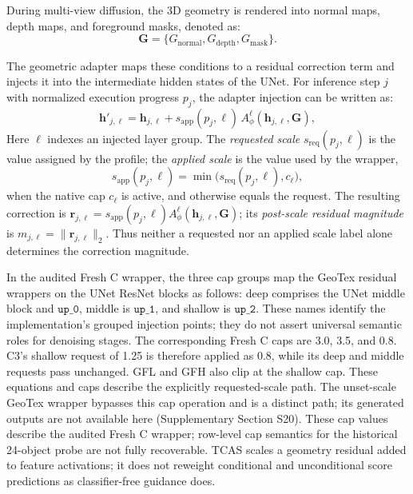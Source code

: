 \documentclass[times,twocolumn,final]{elsarticle}
\providecommand{\DIFadd}[1]{{\protect\color{blue} \sf #1}} %
\providecommand{\DIFaddbegin}{} %
\providecommand{\DIFaddend}{} %
\begin{document}
During multi-view diffusion, the 3D geometry is rendered into normal maps, depth maps, and foreground masks, denoted as:
\begin{equation}
\mathbf{G} = \{G_\text{normal}, G_\text{depth}, G_\text{mask}\}.
\end{equation}

The geometric adapter maps these conditions to a residual correction term and injects it into the intermediate hidden states of the UNet. For   \DIFaddbegin \DIFadd{inference step $j$ with normalized execution progress $p_j$}\DIFaddend , the adapter injection can be written as:
  \DIFaddbegin \begin{equation}
\mathbf{h}'_{j,\ell} = \mathbf{h}_{j,\ell} + s_{\mathrm{app}}(p_j,\ell)\, A^\ell_\phi(\mathbf{h}_{j,\ell}, \mathbf{G}),
\label{eq:injection}
\end{equation}\DIFaddend 
  \DIFaddbegin \DIFadd{Here $\ell$ indexes an injected layer group. The \emph{requested scale} $s_{\mathrm{req}}(p_j,\ell)$ is the value assigned by the profile; the \emph{applied scale} is the value used by the wrapper,
}\begin{equation}
s_{\mathrm{app}}(p_j,\ell)=\min\!\bigl(s_{\mathrm{req}}(p_j,\ell),c_\ell\bigr),
\end{equation}
\DIFadd{when the native cap $c_\ell$ is active, and otherwise equals the request. The resulting correction is $\mathbf{r}_{j,\ell}=s_{\mathrm{app}}(p_j,\ell)A^\ell_\phi(\mathbf{h}_{j,\ell},\mathbf{G})$; its \emph{post-scale residual magnitude} is $m_{j,\ell}=\|\mathbf{r}_{j,\ell}\|_2$. Thus neither a requested nor an applied scale label alone determines the correction magnitude.
}

\DIFadd{In the audited Fresh C wrapper, }\DIFaddend the   \DIFaddbegin \DIFadd{three cap groups map the GeoTex residual wrappers on the UNet ResNet blocks as follows: deep comprises the UNet middle block and $\texttt{up\_0}$, middle is $\texttt{up\_1}$, and shallow is $\texttt{up\_2}$. These names identify the implementation's grouped injection points; they do not assert universal semantic roles for denoising stages. The corresponding Fresh C caps are 3.0, 3.5, and 0.8. C3's shallow request of 1.25 is therefore applied as 0.8, while its deep and middle requests pass unchanged. GFL and GFH also clip at the shallow cap. These equations and caps describe the explicitly requested-scale path. The unset-scale GeoTex wrapper bypasses this cap operation and is a distinct path; its generated outputs are not available here (Supplementary Section S20). These cap values describe the audited Fresh C wrapper; row-level cap semantics for the historical 24-object probe are not fully recoverable. TCAS scales a geometry }\DIFaddend residual added to   \DIFaddbegin \DIFadd{feature activations; it does not reweight conditional and unconditional score predictions as classifier-free guidance does.
}\DIFaddend 
\end{document}
